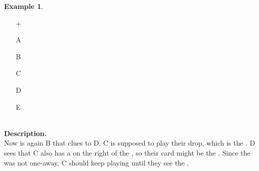 \documentclass[a4paper]{article}
\theoremstyle{plain}
\theoremstyle{definition}
\newtheorem{example}[theorem]{Example}
\begin{document}
\begin{example}	\hfill \\
	\begin{minipage}{0.45\textwidth}
		\begin{itemize}
			\item[\Large +]      
			\item[\Large A]    
			\item[\Large B]    
			\item[\Large C]    
			\item[\Large D]    
			\item[\Large E]    
		\end{itemize}
	\end{minipage}%
	\begin{minipage}{0.55\textwidth}
		\hfill \\
		
		\textbf{Description.} \\
		
		Now is again B that clues  to D. C is supposed to play their drop, which is the . D sees that C also has a  on the right of the , so their card might be the . Since the  was not one-away, C should keep playing until they see the .
	\end{minipage}
\end{example} \vspace{0.15 cm}
\end{document}
